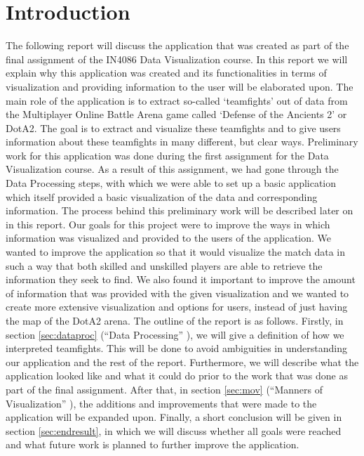 \documentclass[11pt,twoside,a4paper]{article}
\begin{document}
\section*{Introduction}
The following report will discuss the application that was created as part of the final assignment of the IN4086 Data Visualization course. In this report we will explain why this application was created and its functionalities in terms of visualization and providing information to the user will be elaborated upon.
\newline\newline
The main role of the application is to extract so-called `teamfights' out of data from the Multiplayer Online Battle Arena game called `Defense of the Ancients 2' or DotA2. The goal is to extract and visualize these teamfights and to give users information about these teamfights in many different, but clear ways.
\newline\newline
Preliminary work for this application was done during the first assignment for the Data Visualization course. As a result of this assignment, we had gone through the Data Processing steps, with which we were able to set up a basic application which itself provided a basic visualization of the data and corresponding information. The process behind this preliminary work will be described later on in this report.
\newline\newline
Our goals for this project were to improve the ways in which information was visualized and provided to the users of the application. We wanted to improve the application so that it would visualize the match data in such a way that both skilled and unskilled players are able to retrieve the information they seek to find. We also found it important to improve the amount of information that was provided with the given visualization and we wanted to create more extensive visualization and options for users, instead of just having the map of the DotA2 arena.
\newline\newline
The outline of the report is as follows. Firstly, in section \ref{sec:dataproc} (``Data Processing'' ), we will give a definition of how we interpreted teamfights. This will be done to avoid ambiguities in understanding our application and the rest of the report. Furthermore, we will describe what the application looked like and what it could do prior to the work that was done as part of the final assignment. After that, in  section \ref{sec:mov} (``Manners of Visualization'' ), the additions and improvements that were made to the application will be expanded upon. Finally, a short conclusion will be given in section \ref{sec:endresult}, in which we will discuss whether all goals were reached and what future work is planned to further improve the application.
\end{document}
